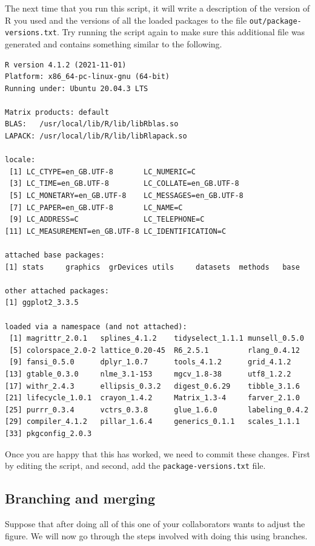 \documentclass[11pt,onecolumn]{scrartcl}
\begin{document}
The next time that you run this script, it will write a description of the
version of R you used and the versions of all the loaded packages to the file
\texttt{out/package-versions.txt}. Try running the script again to make sure this
additional file was generated and contains something similar to the following.

\begin{verbatim}
R version 4.1.2 (2021-11-01)
Platform: x86_64-pc-linux-gnu (64-bit)
Running under: Ubuntu 20.04.3 LTS

Matrix products: default
BLAS:   /usr/local/lib/R/lib/libRblas.so
LAPACK: /usr/local/lib/R/lib/libRlapack.so

locale:
 [1] LC_CTYPE=en_GB.UTF-8       LC_NUMERIC=C
 [3] LC_TIME=en_GB.UTF-8        LC_COLLATE=en_GB.UTF-8
 [5] LC_MONETARY=en_GB.UTF-8    LC_MESSAGES=en_GB.UTF-8
 [7] LC_PAPER=en_GB.UTF-8       LC_NAME=C
 [9] LC_ADDRESS=C               LC_TELEPHONE=C
[11] LC_MEASUREMENT=en_GB.UTF-8 LC_IDENTIFICATION=C

attached base packages:
[1] stats     graphics  grDevices utils     datasets  methods   base

other attached packages:
[1] ggplot2_3.3.5

loaded via a namespace (and not attached):
 [1] magrittr_2.0.1   splines_4.1.2    tidyselect_1.1.1 munsell_0.5.0
 [5] colorspace_2.0-2 lattice_0.20-45  R6_2.5.1         rlang_0.4.12
 [9] fansi_0.5.0      dplyr_1.0.7      tools_4.1.2      grid_4.1.2
[13] gtable_0.3.0     nlme_3.1-153     mgcv_1.8-38      utf8_1.2.2
[17] withr_2.4.3      ellipsis_0.3.2   digest_0.6.29    tibble_3.1.6
[21] lifecycle_1.0.1  crayon_1.4.2     Matrix_1.3-4     farver_2.1.0
[25] purrr_0.3.4      vctrs_0.3.8      glue_1.6.0       labeling_0.4.2
[29] compiler_4.1.2   pillar_1.6.4     generics_0.1.1   scales_1.1.1
[33] pkgconfig_2.0.3
\end{verbatim}

Once you are happy that this has worked, we need to commit these changes. First
by editing the script, and second, add the \texttt{package-versions.txt} file.

\subsection{Branching and merging}
\label{sec:org0f8e725}

Suppose that after doing all of this one of your collaborators wants to adjust
the figure. We will now go through the steps involved with doing this using
branches.
\end{document}
